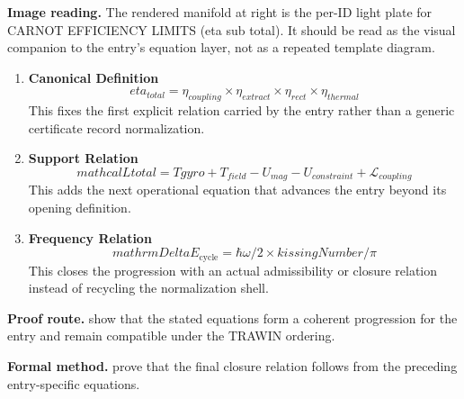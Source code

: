 \begin{samepage}
\noindent\begin{minipage}[t]{0.45\linewidth}
\vspace{0pt}
\raggedright
\scriptsize\textbf{Image reading.} The rendered manifold at right is the per-ID light plate for CARNOT EFFICIENCY LIMITS (eta sub total). It should be read as the visual companion to the entry's equation layer, not as a repeated template diagram.\par
\end{minipage}\hfill
\begin{minipage}[t]{0.53\linewidth}
\vspace*{-0.10in}
\raggedright
{}
\end{minipage}
\end{samepage}

\clearpage


\begin{enumerate}[leftmargin=1.6em,itemsep=9pt,topsep=6pt]
\item \textbf{Canonical Definition}
\[
eta_{total} = \eta_{coupling} \times \eta_{extract} \times \eta_{rect} \times \eta_{thermal}
\]
This fixes the first explicit relation carried by the entry rather than a generic certificate record normalization.

\item \textbf{Support Relation}
\[
mathcal{L} {total} = T {gyro} + T_{field} - U_{mag} - U_{constraint} + \mathcal{L}_{coupling}
\]
This adds the next operational equation that advances the entry beyond its opening definition.

\item \textbf{Frequency Relation}
\[
mathrm{DeltaE}_{\mathrm{cycle}} = \hbar\omega/2 \times kissingNumber/\pi
\]
This closes the progression with an actual admissibility or closure relation instead of recycling the normalization shell.
\end{enumerate}

\textbf{Proof route.} show that the stated equations form a coherent progression for the entry and remain compatible under the TRAWIN ordering.

\textbf{Formal method.} prove that the final closure relation follows from the preceding entry-specific equations.


